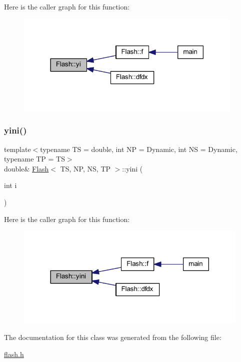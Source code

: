 Here is the caller graph for this function\+:
\nopagebreak
\begin{figure}[H]
\begin{center}
\leavevmode
\includegraphics[width=309pt]{class_flash_a2af985b9562aa54cbc5c3dfd2f4292ef_icgraph}
\end{center}
\end{figure}
\mbox{\label{class_flash_a5bebef2024531af739160f0fc23e3086}} 
\subsubsection{\texorpdfstring{yini()}{yini()}}
{\footnotesize\ttfamily template$<$typename TS = double, int NP = Dynamic, int NS = Dynamic, typename TP = TS$>$ \\
double\& \mbox{\hyperlink{class_flash}{Flash}}$<$ TS, NP, NS, TP $>$\+::yini (\begin{DoxyParamCaption}\item[{int}]{i }\end{DoxyParamCaption})\hspace{0.3cm}{\ttfamily [inline]}}

Here is the caller graph for this function\+:
\nopagebreak
\begin{figure}[H]
\begin{center}
\leavevmode
\includegraphics[width=317pt]{class_flash_a5bebef2024531af739160f0fc23e3086_icgraph}
\end{center}
\end{figure}


The documentation for this class was generated from the following file\+:\begin{DoxyCompactItemize}
\item 
\mbox{\hyperlink{flash_8h}{flash.\+h}}\end{DoxyCompactItemize}
